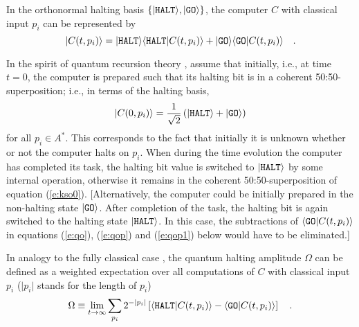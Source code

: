 In the orthonormal halting basis $\{ \vert  {\tt HALT}\rangle  ,\vert
{\tt GO}\rangle
\}$,
the computer $C$ with
classical input
$p_i$ can be represented by
 \begin{equation}
 \vert C(t,p_i) \rangle   =
\vert {\tt HALT} \rangle
\langle {\tt
HALT}\vert
 C(t,p_i)\rangle
+
\vert {\tt GO} \rangle
\langle {\tt
GO}\vert
C(t,p_i)\rangle
\quad .
\label{e:kso}
 \end{equation}

In the spirit of quantum recursion theory \cite{sv:94}, assume
that initially,
i.e., at time $t=0$, the computer is prepared such that its halting bit
is in a coherent 50:50-superposition; i.e.,
in terms of the halting basis,
 \begin{equation}
 \vert C(0,p_i) \rangle   =
{1\over \sqrt{2}}\left( \vert {\tt HALT} \rangle
+
\vert {\tt GO} \rangle \right)
\label{e:kso0}
 \end{equation}
for all $p_i\in A^\ast$.
This corresponds to the fact that initially it is unknown whether or not
the computer halts on $p_i$.
When during the time evolution the  computer has completed its task,
the halting bit value is switched to $\vert {\tt
HALT}\rangle$ by some internal operation,
otherwise it
remains in the  coherent 50:50-superposition
of equation (\ref{e:kso0}).
[Alternatively, the computer could be initially prepared
in the non-halting state $\vert {\tt GO}\rangle $.
After completion of the
task, the halting bit is again
switched to
the halting state $\vert {\tt HALT}\rangle$.
In this case, the subtractions of $\langle {\tt GO}\vert
C(t,p_i) \rangle
$ in equations
(\ref{e:qo}),
(\ref{e:qop}) and
(\ref{e:qop1}) below would have to be eliminated.]



In analogy to the fully classical case \cite{chaitin,solomonoff,calude},
the quantum halting amplitude $\Omega $ can be defined
 as a weighted expectation over all computations of $C$ with classical
input
$p_i$ ($\vert p_i\vert $ stands for the length of $p_i$)
 \begin{equation}
   \Omega \equiv
\lim_{t\rightarrow
\infty }
\sum_{p_i}
2^{-\vert p_i\vert
}
\left[ \langle  {\tt HALT} \vert  C(t,p_i) \rangle
-\langle  {\tt GO} \vert  C(t,p_i) \rangle \right]
\quad .
\label{e:qo}
 \end{equation}

